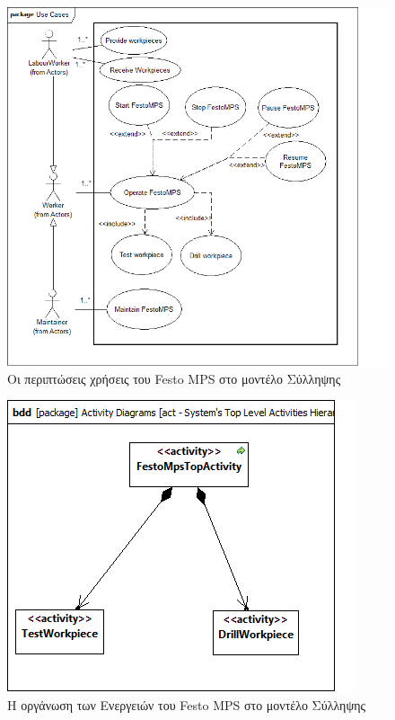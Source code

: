 \documentclass[a4paper,12pt,twoside]{report}
\begin{document}
{\begin{appendices}
\begin{figure}[hp]
					\includegraphics[scale=0.60]{ConceptionalModel_uc-SystemsTopLevelUseCases.png}
					\caption{Οι περιπτώσεις χρήσεις του Festo MPS στο μοντέλο Σύλληψης}
					\label{φωτ:Οι περιπτώσεις χρήσεις του Festo MPS στο μοντέλο Σύλληψης}
				\end{figure}
				\begin{figure}[hp]
					\centering
					\includegraphics[scale=0.45]{ConceptionalModel_act-SystemsTopLevelActivitiesHierarchy.png}
					\caption{Η οργάνωση των Ενεργειών του Festo MPS στο μοντέλο Σύλληψης}
					\label{φωτ:Η οργάνωση των Ενεργειών του Festo MPS στο μοντέλο Σύλληψης}
				\end{figure}

\end{appendices}}
\end{document}
